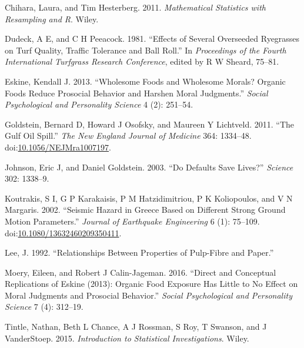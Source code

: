 \documentclass[]{book}
\theoremstyle{plain}
\theoremstyle{mydefn}
\theoremstyle{myexmpl}
\theoremstyle{remark}
\begin{document}
\hypertarget{ref-Chihara2011}{}
Chihara, Laura, and Tim Hesterberg. 2011. \emph{Mathematical Statistics
with Resampling and R}. Wiley.

\hypertarget{ref-Dudeck1981}{}
Dudeck, A E, and C H Peeacock. 1981. ``Effects of Several Overseeded
Ryegrasses on Turf Quality, Traffic Tolerance and Ball Roll.'' In
\emph{Proceedings of the Fourth International Turfgrass Research
Conference}, edited by R W Sheard, 75--81.

\hypertarget{ref-Eskine2013}{}
Eskine, Kendall J. 2013. ``Wholesome Foods and Wholesome Morals? Organic
Foods Reduce Prosocial Behavior and Harshen Moral Judgments.''
\emph{Social Psychological and Personality Science} 4 (2): 251--54.

\hypertarget{ref-Goldstein2011}{}
Goldstein, Bernard D, Howard J Osofsky, and Maureen Y Lichtveld. 2011.
``The Gulf Oil Spill.'' \emph{The New England Journal of Medicine} 364:
1334--48.
doi:\href{https://doi.org/10.1056/NEJMra1007197}{10.1056/NEJMra1007197}.

\hypertarget{ref-Johnson2003}{}
Johnson, Eric J, and Daniel Goldstein. 2003. ``Do Defaults Save Lives?''
\emph{Science} 302: 1338--9.

\hypertarget{ref-Koutrakis2002}{}
Koutrakis, S I, G P Karakaisis, P M Hatzidimitriou, P K Koliopoulos, and
V N Margaris. 2002. ``Seismic Hazard in Greece Based on Different Strong
Ground Motion Parameters.'' \emph{Journal of Earthquake Engineering} 6
(1): 75--109.
doi:\href{https://doi.org/10.1080/13632460209350411}{10.1080/13632460209350411}.

\hypertarget{ref-Lee1992}{}
Lee, J. 1992. ``Relationships Between Properties of Pulp-Fibre and
Paper.''

\hypertarget{ref-Moery2016}{}
Moery, Eileen, and Robert J Calin-Jageman. 2016. ``Direct and Conceptual
Replications of Eskine (2013): Organic Food Exposure Has Little to No
Effect on Moral Judgments and Prosocial Behavior.'' \emph{Social
Psychological and Personality Science} 7 (4): 312--19.

\hypertarget{ref-Tintle2015}{}
Tintle, Nathan, Beth L Chance, A J Rossman, S Roy, T Swanson, and J
VanderStoep. 2015. \emph{Introduction to Statistical Investigations}.
Wiley.
\end{document}
